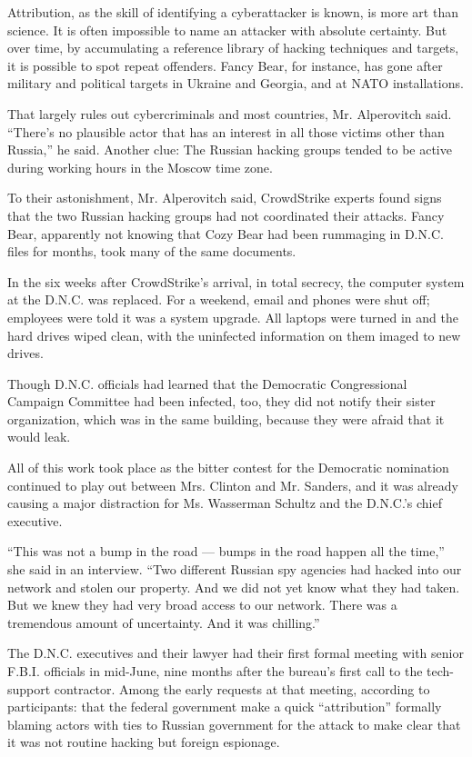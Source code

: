 Attribution, as the skill of identifying a cyberattacker is known, is
more art than science. It is often impossible to name an attacker with
absolute certainty. But over time, by accumulating a reference library
of hacking techniques and targets, it is possible to spot repeat
offenders. Fancy Bear, for instance, has gone after military and
political targets in Ukraine and Georgia, and at NATO installations.

That largely rules out cybercriminals and most countries, Mr.
Alperovitch said. ``There's no plausible actor that has an interest in
all those victims other than Russia,'' he said. Another clue: The
Russian hacking groups tended to be active during working hours in the
Moscow time zone.

To their astonishment, Mr. Alperovitch said, CrowdStrike experts found
signs that the two Russian hacking groups had not coordinated their
attacks. Fancy Bear, apparently not knowing that Cozy Bear had been
rummaging in D.N.C. files for months, took many of the same documents.

In the six weeks after CrowdStrike's arrival, in total secrecy, the
computer system at the D.N.C. was replaced. For a weekend, email and
phones were shut off; employees were told it was a system upgrade. All
laptops were turned in and the hard drives wiped clean, with the
uninfected information on them imaged to new drives.

Though D.N.C. officials had learned that the Democratic Congressional
Campaign Committee had been infected, too, they did not notify their
sister organization, which was in the same building, because they were
afraid that it would leak.

All of this work took place as the bitter contest for the Democratic
nomination continued to play out between Mrs. Clinton and Mr. Sanders,
and it was already causing a major distraction for Ms. Wasserman Schultz
and the D.N.C.'s chief executive.

``This was not a bump in the road --- bumps in the road happen all the
time,'' she said in an interview. ``Two different Russian spy agencies
had hacked into our network and stolen our property. And we did not yet
know what they had taken. But we knew they had very broad access to our
network. There was a tremendous amount of uncertainty. And it was
chilling.''

The D.N.C. executives and their lawyer had their first formal meeting
with senior F.B.I. officials in mid-June, nine months after the bureau's
first call to the tech-support contractor. Among the early requests at
that meeting, according to participants: that the federal government
make a quick ``attribution'' formally blaming actors with ties to
Russian government for the attack to make clear that it was not routine
hacking but foreign espionage.

